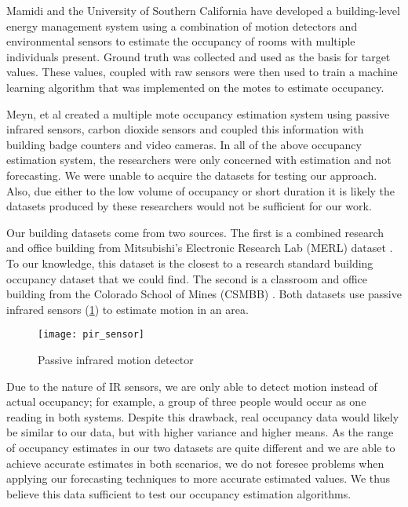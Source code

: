 Mamidi \cite{mamidi2012} and the University of Southern California have developed a building-level energy management system using a combination of motion detectors and environmental sensors to estimate the occupancy of rooms with multiple individuals present.  Ground truth was collected and used as the basis for target values.  These values, coupled with raw sensors were then used to train a machine learning algorithm that was implemented on the motes to estimate occupancy.

Meyn, et al \cite{meyn2009} created a multiple mote occupancy estimation system using passive infrared sensors, carbon dioxide sensors and coupled this information with building badge counters and video cameras.  In all of the above occupancy estimation system, the researchers were only concerned with estimation and not forecasting.  We were unable to acquire the datasets for testing our approach.  Also, due either to the low volume of occupancy or short duration it is likely the datasets produced by these researchers would not be sufficient for our work.  

Our building datasets come from two sources.  The first is a combined research and office building from Mitsubishi's Electronic Research Lab (MERL) dataset \cite{Wren2007}.  To our knowledge, this dataset is the closest to a research standard building occupancy dataset that we could find.  The second is a classroom and office building from the Colorado School of Mines (CSMBB) \cite{Hoff2009, Howard2013}.  Both datasets use passive infrared sensors (\ref{fig:pirsensor}) to estimate motion in an area.  

\begin{figure}[h]
	\begin{center}
		\texttt{[image: pir\_sensor]}
	\end{center}
	\caption{Passive infrared motion detector}
	\label{fig:pirsensor}
\end{figure}

Due to the nature of IR sensors, we are only able to detect motion instead of actual occupancy; for example, a group of three people would occur as one reading in both systems.  Despite this drawback, real occupancy data would likely be similar to our data, but with higher variance and higher means.  As the range of occupancy estimates in our two datasets are quite different and we are able to achieve accurate estimates in both scenarios, we do not foresee problems when applying our forecasting techniques to more accurate estimated values.  We thus believe this data sufficient to test our occupancy estimation algorithms.

